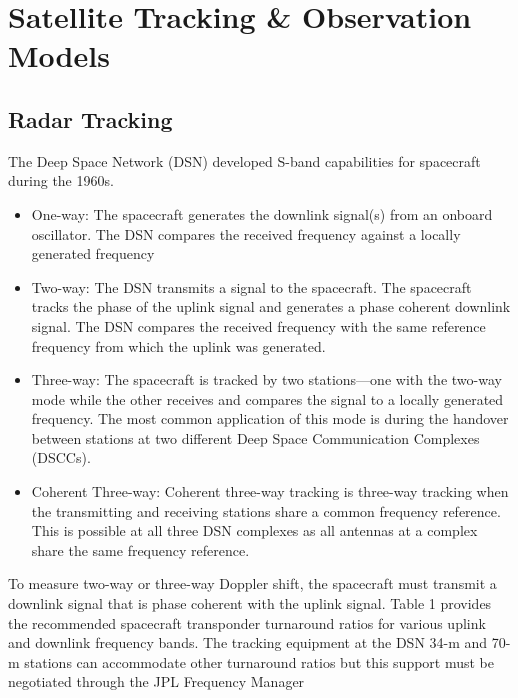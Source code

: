 \section{Satellite Tracking \& Observation Models}

\subsection{Radar Tracking}

The Deep Space Network (DSN) developed S-band capabilities for spacecraft during
the 1960s.

\begin{itemize}
    \item One-way: The spacecraft generates the downlink signal(s) from an
    onboard oscillator. The DSN compares the received frequency against a
    locally generated frequency
    \item Two-way: The DSN transmits a signal to the spacecraft. The spacecraft
    tracks the phase of the uplink signal and generates a phase coherent
    downlink signal. The DSN compares the received frequency with the same
    reference frequency from which the uplink was generated.
    \item Three-way: The spacecraft is tracked by two stations—one with the
    two-way mode while the other receives and compares the signal to a locally
    generated frequency. The most common application of this mode is during the
    handover between stations at two different Deep Space Communication
    Complexes (DSCCs).
    \item Coherent Three-way: Coherent three-way tracking is three-way tracking
    when the transmitting and receiving stations share a common frequency
    reference. This is possible at all three DSN complexes as all antennas at a
    complex share the same frequency reference.
\end{itemize}

To measure two-way or three-way Doppler shift, the spacecraft must transmit a
downlink signal that is phase coherent with the uplink signal. Table 1 provides the recommended
spacecraft transponder turnaround ratios for various uplink and downlink frequency bands. The
tracking equipment at the DSN 34-m and 70-m stations can accommodate other turnaround
ratios but this support must be negotiated through the JPL Frequency Manager

